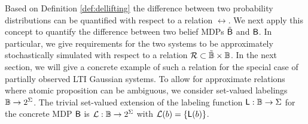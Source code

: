 \documentclass{ifacconf}
\begin{document}


Based on Definition \ref{def:dellifting} the difference between two probability distributions can be quantified with respect to a relation $\rel$. We next apply this concept to quantify the difference between two belief MDPs $\tilde {\mathsf{B}}$ and $\mathsf{B}$. In particular, we give requirements for the two systems  to be approximately stochastically simulated with respect to a relation $\mathcal{R}\subset \tilde {\mathbb{B}} \times \mathbb{B}$. In the next section, we will give a concrete example of such a relation for the special case of partially observed LTI Gaussian systems. To allow for approximate relations where atomic proposition can be ambiguous, we consider set-valued labelings $\mathbb{B}\rightarrow2^\Sigma$. The trivial set-valued extension of the labeling function $\mathsf{L} : \mathbb{B} \rightarrow \Sigma$ for the concrete MDP $\mathsf{B}$ is $\mathcal{L}: \mathbb{B} \rightarrow2^\Sigma$ with $\mathcal{L}(b)=\{\mathsf{L}(b)\}$.
\end{document}
